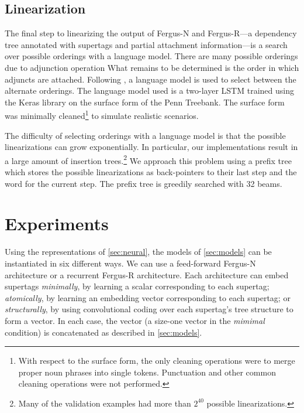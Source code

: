 \documentclass[11pt]{article}
\begin{document}
\subsection{Linearization}

The final step to linearizing the output of Fergus-N and Fergus-R---a dependency tree annotated with supertags and partial attachment information---is a search over possible orderings with a language model. 
%
There are many possible orderings due to adjunction operation
What remains to be determined is the order in which adjuncts are attached. 
%
Following , a language model is used to select between the alternate orderings. 
%
The language model used is a two-layer LSTM trained using the Keras library on
the surface form of the Penn Treebank.
%
The surface form was minimally cleaned\footnote{With respect to the surface form, the only
cleaning operations were to merge proper noun phrases into single tokens.  Punctuation and other
common cleaning operations were not performed.} to simulate realistic scenarios.

The difficulty of selecting orderings with a language model is that the possible linearizations can grow exponentially.
%
In particular, our implementations result in a large amount of insertion trees.\footnote{Many of the validation examples had more than $2^{40}$ possible linearizations.}
%
We approach this problem using a prefix tree which stores the possible linearizations as back-pointers to their last step and the word for the current step. 
%
The prefix tree is greedily searched with 32 beams.




\section{Experiments}
\label{sec:expt}

Using the representations of \ref{sec:neural}, the models of
\ref{sec:models} can be instantiated in six different ways.  We can
use a feed-forward Fergus-N architecture or a recurrent Fergus-R
architecture.  Each architecture can embed supertags \emph{minimally},
by learning a scalar corresponding to each supertag; \emph{atomically}, by learning an
embedding vector corresponding to each supertag; or
\emph{structurally}, by using convolutional coding over each
supertag's tree structure to form a vector.
%
In each case, the vector (a size-one vector in the \emph{mimimal} condition) is concatenated as described in \ref{sec:models}.
\end{document}
